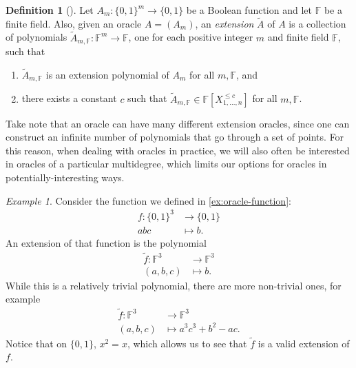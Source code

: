 \documentclass[english,12pt]{reedthesis}
\theoremstyle{plain}
\theoremstyle{definition}
\newtheorem{defn}[defn]{Definition}
\theoremstyle{remark}
\newtheorem{example}{Example}[thm]
\begin{document}
\begin{defn}[{\cite[Def.\ 2.2]{AW09}}]\label{def:ext-oracle}
  Let $A_{m}\colon \{0, 1\}^{m} \rightarrow \{0, 1\}$ be a Boolean function and let
  $\mathbb{F}$ be a finite field. Also, given an oracle $A = (A_{m})$, an
  \emph{extension} $\tilde{A}$ of $A$ is a collection of polynomials
  $\tilde{A}_{m,\mathbb{F}}\colon \mathbb{F}^{m} \rightarrow \mathbb{F}$, one for each
  positive integer $m$ and finite field $\mathbb{F}$, such that
  \begin{enumerate}
    \item $\tilde{A}_{m,\mathbb{F}}$ is an extension polynomial of $A_{m}$ for
          all $m,\mathbb{F}$, and
    \item there exists a constant $c$ such that
          $\tilde{A}_{m,\mathbb{F}} \in \mathbb{F}[X_{1, \ldots, n}^{\le c}]$ for all
          $m, \mathbb{F}$.
  \end{enumerate}
\end{defn}

Take note that an oracle can have many different extension oracles, since one
can construct an infinite number of polynomials that go through a set of points.
For this reason, when dealing with oracles in practice, we will also often be
interested in oracles of a particular multidegree, which limits our options for
oracles in potentially-interesting ways.

\begin{example}\label{ex:oracle-function-ext}
  Consider the function we defined in \cref{ex:oracle-function}:
  \begin{equation}
    \begin{aligned}
      f\colon \{0, 1\}^{3} &\rightarrow \{0, 1\} \\
      abc &\mapsto b.
    \end{aligned}
  \end{equation}
  An extension of that function is the polynomial
  \begin{equation}
    \begin{aligned}
      \tilde{f}\colon \mathbb{F}^{3} &\rightarrow \mathbb{F}^{3} \\
      (a,b,c) &\mapsto b.
    \end{aligned}
  \end{equation}
  While this is a relatively trivial polynomial, there are more non-trivial
  ones, for example
  \begin{equation}
    \begin{aligned}
      \tilde{f}\colon \mathbb{F}^{3} &\rightarrow \mathbb{F}^{3} \\
      (a,b,c) &\mapsto a^{3}c^{3} + b^{2} - ac.
    \end{aligned}
  \end{equation}
  Notice that on $\{0, 1\}$, $x^{2} = x$, which allows us to see that
  $\tilde{f}$ is a valid extension of $f$.
\end{example}
\end{document}
